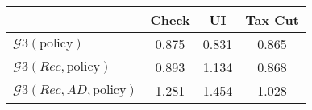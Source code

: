 \begin{tabular}{@{}lccc@{}} 
\toprule 
                          & Check      & UI    & Tax Cut    \\  \midrule 
$\mathcal{G}3(\text{policy})$ & 0.875  & 0.831  & 0.865     \\ 
$\mathcal{G}3(Rec,\text{policy})$ & 0.893  & 1.134  & 0.868     \\ 
$\mathcal{G}3(Rec, AD,\text{policy})$ & 1.281  & 1.454  & 1.028     \\ 
\end{tabular}  
